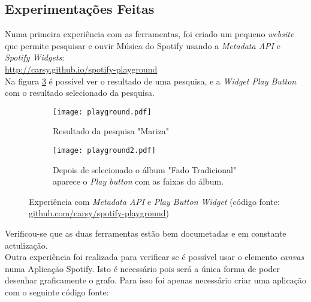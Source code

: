 
  \subsection{Experimentações Feitas} %
  \label{sub:experimentacoes}
  
    Numa primeira experiência com as ferramentas, foi criado um pequeno \emph{website} que permite pesquisar e ouvir Música do Spotify usando a \emph{Metadata API} e \emph{Spotify Widgets}: \\

    \url{http://carsy.github.io/spotify-playground} \\

    Na figura \ref{fig:playground} é possível ver o resultado de uma pesquisa, e a \emph{Widget Play Button} com o resultado selecionado da pesquisa.

    \begin{figure}
      \centering

      \begin{subfigure}[b]{0.38\textwidth}
        \texttt{[image: playground.pdf]}
        \caption{Resultado da pesquisa "Mariza"}
        \label{fig:playgroun_a}
      \end{subfigure}

      \begin{subfigure}[b]{0.38\textwidth}
        \texttt{[image: playground2.pdf]}
        \caption{Depois de selecionado o álbum "Fado Tradicional" aparece o \emph{Play button} com as faixas do álbum.}
        \label{fig:playground_b}
      \end{subfigure}

      \caption{Experiência com \emph{Metadata API} e \emph{Play Button Widget} (código fonte: \url{github.com/carsy/spotify-playground})}
      \label{fig:playground}

    \end{figure}

    Verificou-se que as duas ferramentas estão bem documetadas e em constante actulização. \\

    Outra experiência foi realizada para verificar se é possível usar o elemento \emph{canvas} numa Aplicação Spotify.
    Isto é necessário pois será a única forma de poder desenhar graficamente o grafo.
    Para isso foi apenas necessário criar uma aplicação com o seguinte código fonte:

